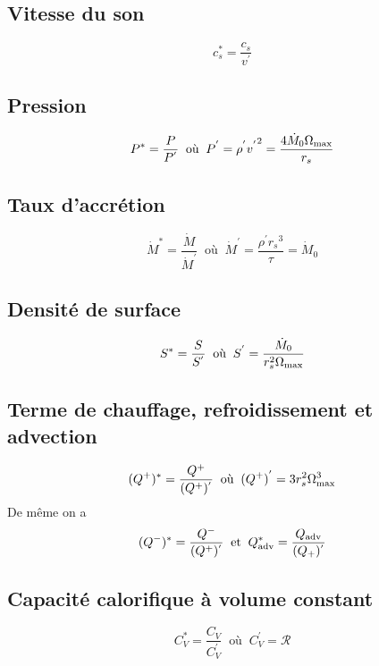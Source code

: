 \documentclass[a4paper,11pt]{article}
\begin{document}
\subsection{Vitesse du son}
    \begin{equation}
        c_s^* = \frac{c_s}{v^{'}}
    \end{equation}

\subsection{Pression}
    \begin{equation}
        P^*=\frac{P}{P^{'}}\;\; \textrm{où} \;\;P^{'}=\rho^{'}{v^{'}}^2=\frac{4\dot{M}_0\Omega_{\rm{max}}}{r_s}
    \end{equation}
    
\subsection{Taux d'accrétion}
    \begin{equation}
        \dot{M}^*=\frac{\dot{M}}{\dot{M}^{'}}\;\; \textrm{où} \;\;\dot{M}^{'}=\frac{\rho^{'}{r_s}^3}{\tau}=\dot{M}_0
    \end{equation}
    
\subsection{Densité de surface}
    \begin{equation}
        S^* = \frac{S}{S^{'}} \;\; \textrm{où} \;\; S^{'} = \frac{\dot{M}_0}{r_s^2 \Omega_{\rm{max}}}
    \end{equation}
    
\subsection{Terme de chauffage, refroidissement et advection}
    \begin{equation}
        (Q^{+})^* = \frac{Q^{+}}{(Q^{+})^{'}}\;\; \textrm{où} \;\; (Q^{+})^{'} = 3 r_s^2 \Omega_{\rm{max}}^3
    \end{equation}
    De même on a
    \begin{equation}
        (Q^-)^* = \frac{Q^-}{(Q^+)^{'}} \;\; \textrm{et} \;\; Q_{\rm{adv}}^* = \frac{Q_{\rm{adv}}}{(Q_+)^{'}}
    \end{equation}
    
\subsection{Capacité calorifique à volume constant}
    \begin{equation}
        C_V^* = \frac{C_V}{C_V^{'}}\;\; \textrm{où} \;\; C_V^{'} = \mathcal{R}
    \end{equation}
    
\end{document}
